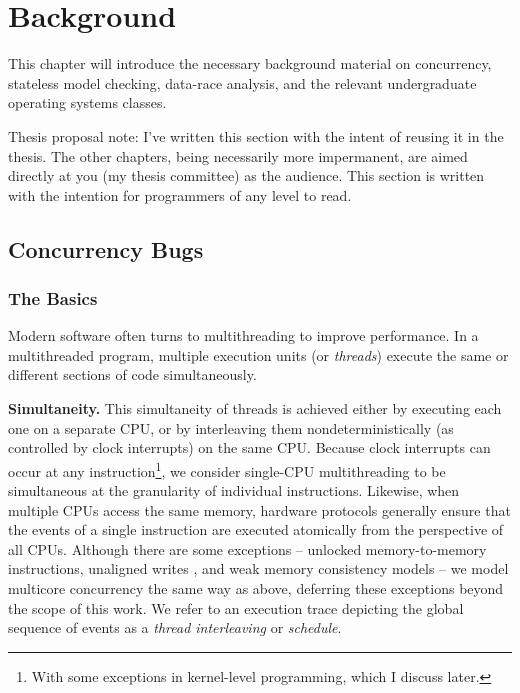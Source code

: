 \chapter{Background}
\label{chap:background}

This chapter will introduce the necessary background material on concurrency, stateless model checking, data-race analysis, and the relevant undergraduate operating systems classes.

Thesis proposal note: I've written this section with the intent of reusing it in the thesis. The other chapters, being necessarily more impermanent, are aimed directly at you (my thesis committee) as the audience. This section is written with the intention for programmers of any level to read.

\section{Concurrency Bugs}

\subsection{The Basics}

Modern software often turns to multithreading to improve performance.
In a multithreaded program, multiple execution units (or {\em threads}) execute the same or different sections of code simultaneously.

{\bf Simultaneity.}
This simultaneity of threads is achieved either by executing each one on a separate CPU, or by interleaving them nondeterministically (as controlled by clock interrupts) on the same CPU.
Because clock interrupts can occur at any instruction\footnote{
	With some exceptions in kernel-level programming, which I discuss later.
},
we consider single-CPU multithreading to be simultaneous at the granularity of individual instructions.
%
Likewise, when multiple CPUs access the same memory,
hardware protocols generally ensure that the events of a single instruction are executed atomically from the perspective of all CPUs.
Although there are some exceptions --
unlocked memory-to-memory instructions,
unaligned writes \cite{unaligned-writes},
and weak memory consistency models \cite{memory-consistency-models} --
we model multicore concurrency the same way as above,
deferring these exceptions beyond the scope of this work.
We refer to an execution trace depicting the global sequence of events as a {\em thread interleaving} or {\em schedule}.

